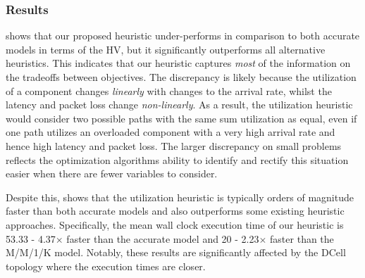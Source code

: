 \subsubsection{Results}
 shows that our proposed heuristic under-performs in comparison to both accurate models in terms of the HV, but it significantly outperforms all alternative heuristics. This indicates that our heuristic captures \textit{most} of the information on the tradeoffs between objectives. The discrepancy is likely because the utilization of a component changes \textit{linearly} with changes to the arrival rate, whilst the latency and packet loss change \textit{non-linearly}. As a result, the utilization heuristic would consider two possible paths with the same sum utilization as equal, even if one path utilizes an overloaded component with a very high arrival rate and hence high latency and packet loss. The larger discrepancy on small problems reflects the optimization algorithms ability to identify and rectify this situation easier when there are fewer variables to consider.



Despite this,  shows that the utilization heuristic is typically orders of magnitude faster than both accurate models and also outperforms some existing heuristic approaches. Specifically, the mean wall clock execution time of our heuristic is 53.33 - 4.37$\times$ faster than the accurate model and 20 - 2.23$\times$ faster than the M/M/1/K model. Notably, these results are significantly affected by the DCell topology where the execution times are closer.

